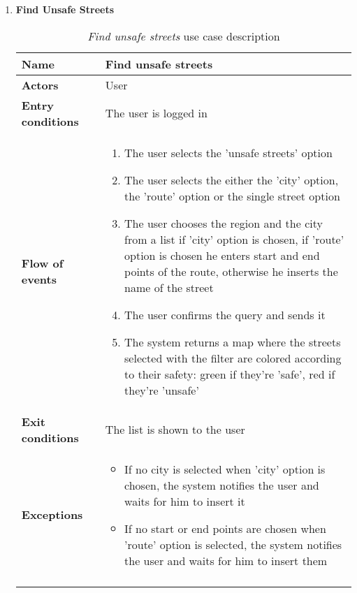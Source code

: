\begin{enumerate}
		\item \textbf{Find Unsafe Streets}
			\begin{longtable}{p{0.25\linewidth}p{0.75\linewidth}}
				\toprule
				\textbf{Name} & \textbf{Find unsafe streets} \\
				\midrule
				\textbf{Actors} & User \\
				\midrule
				\textbf{Entry conditions} & The user is logged in \\
				\midrule
				\textbf{Flow of events} & 
				\begin{enumerate}
					\item The user selects the 'unsafe streets' option
					\item The user selects the either the 'city' option, the 'route' option or the single street option
					\item The user chooses the region and the city from a list if 'city' option is chosen, if 'route' option is chosen he enters start and end points of the route, otherwise he inserts the name of the street
					\item The user confirms the query and sends it
					\item The system returns a map where the streets selected with the filter are colored according to their safety: green if they're 'safe', red if they're 'unsafe'
				\end{enumerate} \\
				\midrule
				\textbf{Exit conditions} & The list is shown to the user\\
				\midrule
				\textbf{Exceptions} & 
				\begin{itemize}
					\item If no city is selected when 'city' option is chosen, the system notifies the user and waits for him to insert it
					\item If no start or end points are chosen when 'route' option is selected, the system notifies the user and waits for him to insert them
				\end{itemize} \\
				\bottomrule
				\caption{\emph{Find unsafe streets} use case description}
			\end{longtable}
	\end{enumerate}
		
